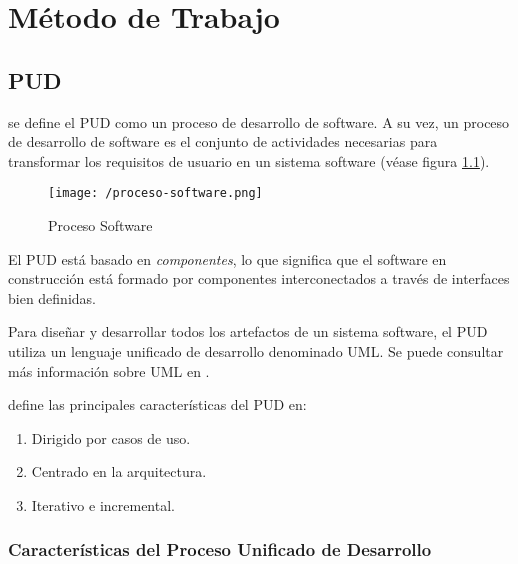 \chapter{Método de Trabajo}
\label{chap:metodo}
\label{chap:metodologia}


\section{\acf{PUD}}

 \cite{rumbaugh_jacobson_pud} se define el \acf{PUD} como un proceso de desarrollo
de software. A su vez, un proceso de desarrollo de software es el conjunto de
actividades necesarias para transformar los requisitos de usuario en un sistema
software (véase figura \ref{fig:proc-software}). 

\begin{figure}[!h]
  \begin{center}
    \texttt{[image: /proceso-software.png]} 
    \caption{Proceso Software \cite{rumbaugh_jacobson_pud}}
    \label{fig:proc-software}
  \end{center}
\end{figure}


El \acs{PUD} está basado en \textit{componentes}, lo que significa que el
software en construcción está formado por componentes interconectados a través de
interfaces bien definidas. 

Para diseñar y desarrollar todos los artefactos de un sistema software, el \acs{PUD}
utiliza un lenguaje unificado de desarrollo denominado \acf{UML}. Se puede consultar más información sobre \acs{UML} en \cite{rumbaugh_unified_2004}. 

\cite{rumbaugh_jacobson_pud} define las principales características del
\acs{PUD} en: 

\begin{enumerate}
\item Dirigido por casos de uso.
\item Centrado en la arquitectura.
\item Iterativo e incremental.
\end{enumerate}

\subsection{Características del Proceso Unificado de Desarrollo}

